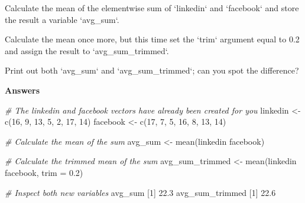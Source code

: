 \documentclass[]{article}
\newcommand{\hlnum}[1]{\textcolor[rgb]{0.816,0.125,0.439}{#1}}%
\newcommand{\hlstr}[1]{\textcolor[rgb]{0.251,0.627,0.251}{#1}}%
\newcommand{\hlcom}[1]{\textcolor[rgb]{0.502,0.502,0.502}{\textit{#1}}}%
\newcommand{\hlstd}[1]{\textcolor[rgb]{0.251,0.251,0.251}{#1}}%
\newcommand{\hlkwc}[1]{\textcolor[rgb]{0.251,0.251,0.251}{#1}}%
\newcommand{\hlkwd}[1]{\textcolor[rgb]{0.878,0.439,0.125}{#1}}%
\newenvironment{Shaded}{\begin{myshaded}}{\end{myshaded}}
\newcommand{\KeywordTok}[1]{\hlkwd{#1}}
\newcommand{\DataTypeTok}[1]{\hlkwc{#1}}
\newcommand{\DecValTok}[1]{\hlnum{#1}}
\newcommand{\FloatTok}[1]{\hlnum{#1}}
\newcommand{\StringTok}[1]{\hlstr{#1}}
\newcommand{\CommentTok}[1]{\hlcom{#1}}
\newcommand{\NormalTok}[1]{\hlstd{#1}}
\begin{document}
\begin{Shaded}
\begin{Highlighting}[]

\OperatorTok{*}\StringTok{ }\NormalTok{Calculate the mean of the element}\OperatorTok{-}\NormalTok{wise sum of }\StringTok{`}\DataTypeTok{linkedin}\StringTok{`}\NormalTok{ and }\StringTok{`}\DataTypeTok{facebook}\StringTok{`}\NormalTok{ and store the result }\NormalTok{ a variable }\StringTok{`}\DataTypeTok{avg_sum}\StringTok{`}\NormalTok{.}

\OperatorTok{*}\StringTok{ }\NormalTok{Calculate the mean once more, but this time set the }\StringTok{`}\DataTypeTok{trim}\StringTok{`}\NormalTok{ argument equal to }\FloatTok{0.2}\NormalTok{ and assign the result to }\StringTok{`}\DataTypeTok{avg_sum_trimmed}\StringTok{`}\NormalTok{.}

\OperatorTok{*}\StringTok{ }\NormalTok{Print out both }\StringTok{`}\DataTypeTok{avg_sum}\StringTok{`}\NormalTok{ and }\StringTok{`}\DataTypeTok{avg_sum_trimmed}\StringTok{`}\NormalTok{; can you spot the difference?}
\end{Highlighting}
\end{Shaded}

\textbf{Answers}

\begin{Shaded}
\begin{Highlighting}[]
\CommentTok{# The linkedin and facebook vectors have already been created for you}
\NormalTok{linkedin <-}\StringTok{ }\KeywordTok{c}\NormalTok{(}\DecValTok{16}\NormalTok{, }\DecValTok{9}\NormalTok{, }\DecValTok{13}\NormalTok{, }\DecValTok{5}\NormalTok{, }\DecValTok{2}\NormalTok{, }\DecValTok{17}\NormalTok{, }\DecValTok{14}\NormalTok{)}
\NormalTok{facebook <-}\StringTok{ }\KeywordTok{c}\NormalTok{(}\DecValTok{17}\NormalTok{, }\DecValTok{7}\NormalTok{, }\DecValTok{5}\NormalTok{, }\DecValTok{16}\NormalTok{, }\DecValTok{8}\NormalTok{, }\DecValTok{13}\NormalTok{, }\DecValTok{14}\NormalTok{)}

\CommentTok{# Calculate the mean of the sum}
\NormalTok{avg_sum <-}\StringTok{ }\KeywordTok{mean}\NormalTok{(linkedin }\OperatorTok{+}\StringTok{ }\NormalTok{facebook)}

\CommentTok{# Calculate the trimmed mean of the sum}
\NormalTok{avg_sum_trimmed <-}\StringTok{ }\KeywordTok{mean}\NormalTok{(linkedin }\OperatorTok{+}\StringTok{ }\NormalTok{facebook, }\DataTypeTok{trim =} \FloatTok{0.2}\NormalTok{)}

\CommentTok{# Inspect both new variables}
\NormalTok{avg_sum}
\NormalTok{   [}\DecValTok{1}\NormalTok{] }\FloatTok{22.3}
\NormalTok{avg_sum_trimmed}
\NormalTok{   [}\DecValTok{1}\NormalTok{] }\FloatTok{22.6}
\end{Highlighting}
\end{Shaded}
\end{document}
